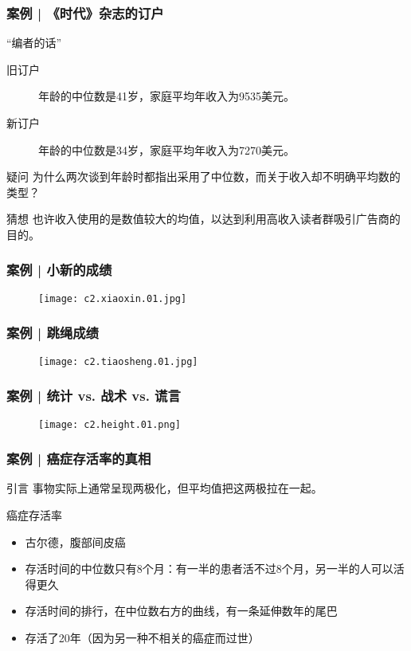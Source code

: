 \begin{frame}
  \frametitle{案例 | 《时代》杂志的订户}
  \begin{block}{“编者的话”}
    \begin{description}
      \item[旧订户] 年龄的中位数是41岁，家庭平均年收入为9535美元。
      \item[新订户] 年龄的中位数是34岁，家庭平均年收入为7270美元。
    \end{description}
  \end{block}
  \pause
  \begin{block}{疑问}
    为什么两次谈到年龄时都指出采用了中位数，而关于收入却不明确平均数的类型？
  \end{block}
  \pause
  \begin{block}{猜想}
    也许收入使用的是数值较大的均值，以达到利用高收入读者群吸引广告商的目的。
  \end{block}
\end{frame}

\begin{frame}
  \frametitle{案例 | 小新的成绩}
  \begin{figure}
    \centering
    \texttt{[image: c2.xiaoxin.01.jpg]}
  \end{figure}
\end{frame}

\begin{frame}
  \frametitle{案例 | 跳绳成绩}
  \begin{figure}
    \centering
    \texttt{[image: c2.tiaosheng.01.jpg]}
  \end{figure}
\end{frame}

\begin{frame}
  \frametitle{案例 | 统计 vs. 战术 vs. 谎言}
  \begin{figure}
    \centering
    \texttt{[image: c2.height.01.png]}
  \end{figure}
\end{frame}

\begin{frame}
  \frametitle{案例 | 癌症存活率的真相}
  \begin{block}{引言}
    事物实际上通常呈现两极化，但平均值把这两极拉在一起。
  \end{block}
  \pause
  \begin{block}{癌症存活率}
    \begin{itemize}
      \item 古尔德，腹部间皮癌
      \item 存活时间的中位数只有8个月：有一半的患者活不过8个月，另一半的人可以活得更久
      \item 存活时间的排行，在中位数右方的曲线，有一条延伸数年的尾巴
      \item 存活了20年（因为另一种不相关的癌症而过世）
    \end{itemize}
  \end{block}
\end{frame}

